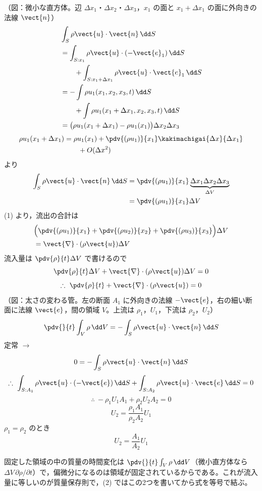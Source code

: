 （図：微小な直方体。辺 $\Delta x_{1}$・$\Delta x_{2}$・$\Delta x_{3}$，$x_{1}$ の面と $x_{1}+\Delta x_{1}$ の面に外向きの法線 $\vect{n}$）
\begin{align*}
&\int_{S}\rho\vect{u}\cdot\vect{n}\,\dd S\\
&=\int_{S:x_{1}}\rho\vect{u}\cdot(-\vect{e}_{1})\,\dd S\\
&\qquad+\int_{S:x_{1}+\Delta x_{1}}\rho\vect{u}\cdot\vect{e}_{1}\,\dd S\\
&=-\int\rho u_{1}(x_{1},x_{2},x_{3},t)\,\dd S\\
&\qquad+\int\rho u_{1}(x_{1}+\Delta x_{1},x_{2},x_{3},t)\,\dd S\\
&=\bigl(\rho u_{1}(x_{1}+\Delta x_{1})-\rho u_{1}(x_{1})\bigr)\Delta x_{2}\Delta x_{3}
\end{align*}
\begin{align*}
\rho u_{1}(x_{1}+\Delta x_{1})&=\rho u_{1}(x_{1})+\pdv{(\rho u_{1})}{x_{1}}\kakimachigai{\Delta x}{\Delta x_{1}}\\
&\qquad+O(\Delta x^{2})
\end{align*}
より
\begin{align*}
\int_{S}\rho\vect{u}\cdot\vect{n}\,\dd S&=\pdv{(\rho u_{1})}{x_{1}}\underbrace{\Delta x_{1}\Delta x_{2}\Delta x_{3}}_{\Delta V}\\
&=\pdv{(\rho u_{1})}{x_{1}}\Delta V
\end{align*}
(1) より，流出の合計は
\begin{align*}
&\Bigl(\pdv{(\rho u_{1})}{x_{1}}+\pdv{(\rho u_{2})}{x_{2}}+\pdv{(\rho u_{3})}{x_{3}}\Bigr)\Delta V\\
&=\vect{\nabla}\cdot(\rho\vect{u})\Delta V
\end{align*}
流入量は $\pdv{\rho}{t}\Delta V$ で書けるので
\[ \pdv{\rho}{t}\Delta V+\vect{\nabla}\cdot(\rho\vect{u})\Delta V=0 \]
\[ \therefore\ \pdv{\rho}{t}+\vect{\nabla}\cdot(\rho\vect{u})=0 \]
（図：太さの変わる管。左の断面 $A_{1}$ に外向きの法線 $-\vect{e}$，右の細い断面に法線 $\vect{e}$，間の領域 $V$。上流は $\rho_{1}$，$U_{1}$，下流は $\rho_{2}$，$U_{2}$）
\[ \pdv{}{t}\int_{V}\rho\,\dd V=-\int_{S}\rho\vect{u}\cdot\vect{n}\,\dd S \]
定常 $\to$
\[ 0=-\int_{S}\rho\vect{u}\cdot\vect{n}\,\dd S \]
\[ \therefore\ \int_{S:A_{1}}\rho\vect{u}\cdot(-\vect{e})\,\dd S+\int_{S:A_{2}}\rho\vect{u}\cdot\vect{e}\,\dd S=0 \]
\[ \therefore\ -\rho_{1}U_{1}A_{1}+\rho_{2}U_{2}A_{2}=0 \]
\[ U_{2}=\frac{\rho_{1}A_{1}}{\rho_{2}A_{2}}U_{1} \]
$\rho_{1}=\rho_{2}$ のとき
\[ U_{2}=\frac{A_{1}}{A_{2}}U_{1} \]
\item 固定した領域の中の質量の時間変化は $\pdv{}{t}\int_{V}\rho\,\dd V$（微小直方体なら $\Delta V\,\partial\rho/\partial t$）で，偏微分になるのは領域が固定されているからである。これが流入量に等しいのが質量保存則で，(2) ではこの2つを書いてから式を等号で結ぶ。

